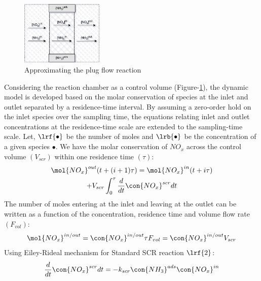 \begin{figure}[ht]
    \centering
    \includegraphics[width=0.35\textwidth]{figs/2_mdl/plug_flow_discrete.png}
    \caption{Approximating the plug flow reaction}
    \label{fig:plug-flow}
\end{figure}
Considering the reaction chamber as a control volume (Figure-\ref{fig:plug-flow}), the dynamic model is developed based
on the molar conservation of species at the inlet and outlet separated by a residence-time interval. By assuming a
zero-order hold on the inlet species over the sampling time, the equations relating inlet and outlet concentrations at
the residence-time scale are extended to the sampling-time scale.
Let, $\lrf{\bullet}$ be the number of moles and $\lrb{\bullet}$ be the concentration of a given species $\bullet$. We have the molar conservation of $NO_x$ across the control volume $(V_{scr})$ within one residence time $(\tau)$:
\begin{multline}
        \mol{NO_x}^{out} (t + (i+1) \tau) =
                \mol{NO_x}^{in} (t + i \tau) \\
                + V_{scr} \int_0^{\tau} \frac{d}{dt} \con{NO_x}^{scr}dt
        \label{eqn::nox_bal}
\end{multline}
The number of moles entering at the inlet and leaving at the outlet can be written as a function of the concentration, residence time and volume flow rate $(F_{vol})$:
\begin{align}
    \mol{NO_x}^{in/out} = \con{NO_x}^{in/out} \tau F_{vol} = \con{NO_x}^{in/out} V_{scr}
\end{align}
Using Eiley-Rideal mechanism for Standard SCR reaction $\lrf{2}$:
\begin{align}
    \frac{d}{dt} \con{NO_x}^{scr}dt = -k_{scr} \con{NH_3}^{ads} \con{NO_x}^{in}
\end{align}
